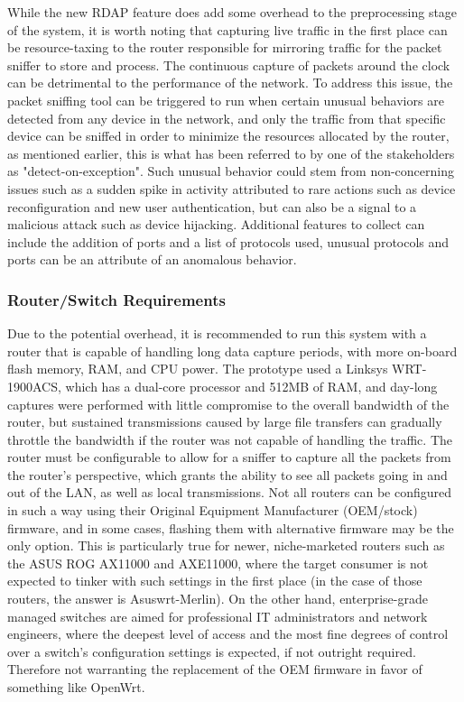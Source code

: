 \documentclass{article}
\begin{document}
While the new RDAP feature does add some overhead to the preprocessing
stage of the system, it is worth noting that capturing live traffic in
the first place can be resource-taxing to the router responsible for
mirroring traffic for the packet sniffer to store and process. The
continuous capture of packets around the clock can be detrimental to the
performance of the network. To address this issue, the packet sniffing
tool can be triggered to run when certain unusual behaviors are detected
from any device in the network, and only the traffic from that specific
device can be sniffed in order to minimize the resources allocated by
the router, as mentioned earlier, this is what has been referred to by one of the stakeholders as "detect-on-exception". Such unusual behavior could stem from non-concerning issues
such as a sudden spike in activity attributed to rare actions such as
device reconfiguration and new user authentication, but can also be a
signal to a malicious attack such as device hijacking. Additional
features to collect can include the addition of ports and a list of
protocols used, unusual protocols and ports can be an attribute of an
anomalous behavior.

\subsubsection{Router/Switch Requirements}

Due to the potential overhead, it is recommended to run this system with
a router that is capable of handling long data capture periods, with
more on-board flash memory, RAM, and CPU power. The prototype used a
Linksys WRT-1900ACS, which has a dual-core processor and 512MB of RAM,
and day-long captures were performed with little compromise to the
overall bandwidth of the router, but sustained transmissions caused by
large file transfers can gradually throttle the bandwidth if the router
was not capable of handling the traffic. The router must be configurable
to allow for a sniffer to capture all the packets from the router's
perspective, which grants the ability to see all packets going in and
out of the LAN, as well as local transmissions. Not all routers can be
configured in such a way using their Original Equipment Manufacturer
(OEM/stock) firmware, and in some cases, flashing them with alternative
firmware may be the only option. This is particularly true for newer,
niche-marketed routers such as the ASUS ROG AX11000 and AXE11000, where
the target consumer is not expected to tinker with such settings in the
first place (in the case of those routers, the answer is
Asuswrt-Merlin). On the other hand, enterprise-grade managed switches
are aimed for professional IT administrators and network engineers,
where the deepest level of access and the most fine degrees of control over
a switch's configuration settings is expected, if not outright required. Therefore not
warranting the replacement of the OEM firmware in favor of something
like OpenWrt.
\end{document}
